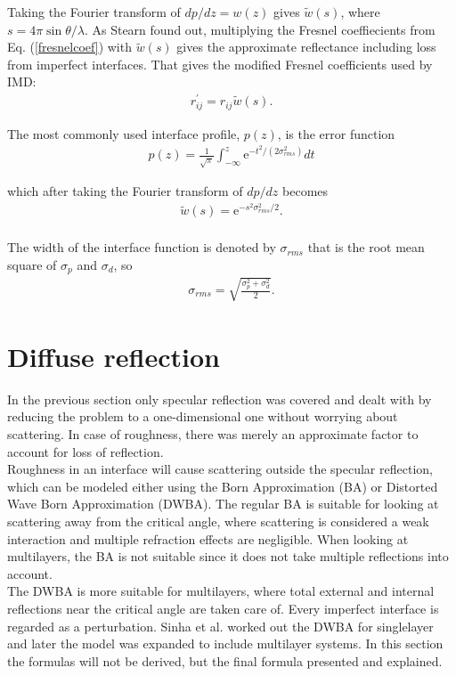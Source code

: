 Taking the Fourier transform of $dp/dz=w(z)$ gives $\tilde{w}(s)$, where $s = 4 \pi \sin{\theta}/\lambda$. As Stearn found out, multiplying the Fresnel coeffiecients from Eq. (\ref{fresnelcoef}) with $\tilde{w}(s)$ gives the approximate reflectance including loss from imperfect interfaces. That gives the modified Fresnel coefficients used by IMD:
\begin{eqnarray}
	r_{ij}^{'} = r_{ij} \tilde{w}(s).
\end{eqnarray}

The most commonly used interface profile, $p(z)$, is the error function
\begin{eqnarray}
	p(z) = \frac{1}{\sqrt{\pi}}\int_{-\infty}^z \mathrm{e}^{-t^2/(2\sigma_{rms}^{2})}dt
\end{eqnarray}

which after taking the Fourier transform of $dp/dz$ becomes
\begin{eqnarray}\label{interfacefunction}
	\tilde{w}(s) = \mathrm{e}^{-s^2\sigma_{rms}^2/2}.
\end{eqnarray}\\

The width of the interface function is denoted by $\sigma_{rms}$ that is the root mean square of $\sigma_p$ and $\sigma_d$, so
\begin{eqnarray}
	\sigma_{rms} = \sqrt{\frac{\sigma_p^2 + \sigma_d^2}{2}}.
\end{eqnarray}

\section{Diffuse reflection}\label{diffuserefl}
In the previous section only specular reflection was covered and dealt with by reducing the problem to a one-dimensional one without worrying about scattering. In case of roughness, there was merely an approximate factor to account for loss of reflection.\\
Roughness in an interface will cause scattering outside the specular reflection, which can be modeled either using the Born Approximation (BA) or Distorted Wave Born Approximation (DWBA)\cite{Sinha:1988uu}. The regular BA is suitable for looking at scattering away from the critical angle, where scattering is considered a weak interaction and multiple refraction effects are negligible. When looking at multilayers, the BA is not suitable since it does not take multiple reflections into account.\\
The DWBA is more suitable for multilayers, where total external and internal reflections near the critical angle are taken care of. Every imperfect interface is regarded as a perturbation. Sinha et al.\cite{Sinha:1988uu} worked out the DWBA for singlelayer and later the model was expanded to include multilayer systems\cite{Stearns:1998wn,Kopecky:1995uy,Holy:1993p5469}. In this section the formulas will not be derived, but the final formula presented and explained.\\

